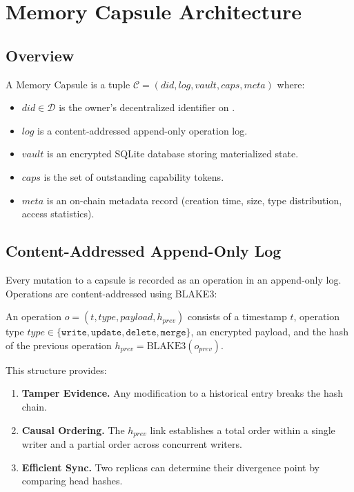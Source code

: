 \section{Memory Capsule Architecture}

\label{sec:architecture}

\subsection{Overview}

A Memory Capsule is a tuple $\mathcal{C} = (\textit{did}, \textit{log}, \textit{vault}, \textit{caps}, \textit{meta})$ where:

\begin{itemize}
    \item $\textit{did} \in \mathcal{D}$ is the owner's decentralized identifier on \IChain{}.
    \item $\textit{log}$ is a content-addressed append-only operation log.
    \item $\textit{vault}$ is an encrypted SQLite database storing materialized state.
    \item $\textit{caps}$ is the set of outstanding capability tokens.
    \item $\textit{meta}$ is an on-chain metadata record (creation time, size, type distribution, access statistics).
\end{itemize}

\subsection{Content-Addressed Append-Only Log}

Every mutation to a capsule is recorded as an operation in an append-only log. Operations are content-addressed using BLAKE3:

\begin{definition}
An operation $o = (t, \textit{type}, \textit{payload}, h_{\textit{prev}})$ consists of a timestamp $t$, operation type $\textit{type} \in \{\texttt{write}, \texttt{update}, \texttt{delete}, \texttt{merge}\}$, an encrypted payload, and the hash of the previous operation $h_{\textit{prev}} = \text{BLAKE3}(o_{\textit{prev}})$.
\end{definition}

This structure provides:
\begin{enumerate}
    \item \textbf{Tamper Evidence.} Any modification to a historical entry breaks the hash chain.
    \item \textbf{Causal Ordering.} The $h_{\textit{prev}}$ link establishes a total order within a single writer and a partial order across concurrent writers.
    \item \textbf{Efficient Sync.} Two replicas can determine their divergence point by comparing head hashes.
\end{enumerate}

